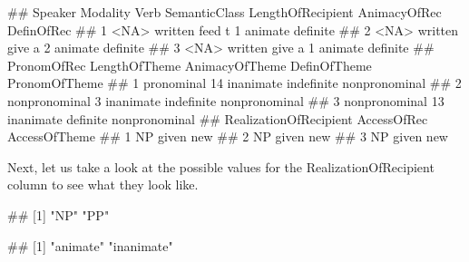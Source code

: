 \documentclass[
]{book}
\newenvironment{Shaded}{\begin{snugshade}}{\end{snugshade}}
\newcommand{\FunctionTok}[1]{\textcolor[rgb]{0.13,0.29,0.53}{\textbf{#1}}}
\newcommand{\NormalTok}[1]{#1}
\newcommand{\SpecialCharTok}[1]{\textcolor[rgb]{0.81,0.36,0.00}{\textbf{#1}}}
\begin{document}
\begin{Shaded}
\begin{Highlighting}[]
\NormalTok{\#\#   Speaker Modality Verb SemanticClass LengthOfRecipient AnimacyOfRec DefinOfRec}
\NormalTok{\#\# 1    \textless{}NA\textgreater{}  written feed             t                 1      animate   definite}
\NormalTok{\#\# 2    \textless{}NA\textgreater{}  written give             a                 2      animate   definite}
\NormalTok{\#\# 3    \textless{}NA\textgreater{}  written give             a                 1      animate   definite}
\NormalTok{\#\#     PronomOfRec LengthOfTheme AnimacyOfTheme DefinOfTheme PronomOfTheme}
\NormalTok{\#\# 1    pronominal            14      inanimate   indefinite nonpronominal}
\NormalTok{\#\# 2 nonpronominal             3      inanimate   indefinite nonpronominal}
\NormalTok{\#\# 3 nonpronominal            13      inanimate     definite nonpronominal}
\NormalTok{\#\#   RealizationOfRecipient AccessOfRec AccessOfTheme}
\NormalTok{\#\# 1                     NP       given           new}
\NormalTok{\#\# 2                     NP       given           new}
\NormalTok{\#\# 3                     NP       given           new}
\end{Highlighting}
\end{Shaded}

Next, let us take a look at the possible values for the RealizationOfRecipient column to see what they look like.

\begin{Shaded}
\end{Shaded}

\begin{Shaded}
\begin{Highlighting}[]
\NormalTok{\#\# [1] "NP" "PP"}
\end{Highlighting}
\end{Shaded}

\begin{Shaded}
\end{Shaded}

\begin{Shaded}
\begin{Highlighting}[]
\NormalTok{\#\# [1] "animate"   "inanimate"}
\end{Highlighting}
\end{Shaded}
\end{document}

